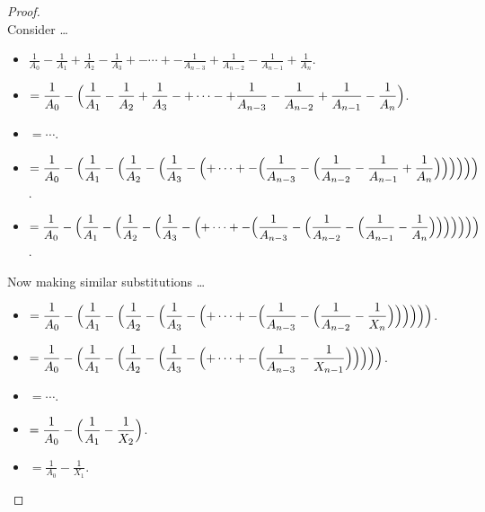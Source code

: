 \documentclass[12pt]{article}
\newcommand{\ds}{\displaystyle}
\theoremstyle{plain}
\begin{document}
\begin{proof}
  \ \\

  Consider \dots

  \begin{itemize}
    \item $ \ds \frac{1}{A_{0}} - \frac{1}{A_{1}} + \frac{1}{A_{2}} - \frac{1}{A_{3}} +- \cdots +- \frac{1}{A_{n-3}} + \frac{1}{A_{n-2}} - \frac{1}{A_{n-1}} + \frac{1}{A_{n}} $.
    \item $ \ds = \frac{1}{A_{0}} - \Bigl( \frac{1}{A_{1}} - \frac{1}{A_{2}} + \frac{1}{A_{3}} -+ \cdots -+ \frac{1}{A_{n-3}} - \frac{1}{A_{n-2}} + \frac{1}{A_{n-1}} - \frac{1}{A_{n}} \Bigr) $.
    \item $ \ds = \cdots $.
    \item $ \ds = \frac{1}{A_{0}} - \Bigl( \frac{1}{A_{1}} - \Bigl( \frac{1}{A_{2}} - \Bigl( \frac{1}{A_{3}} - \Bigl( + \cdots +- \Bigl( \frac{1}{A_{n-3}} - \Bigl( \frac{1}{A_{n-2}} - \frac{1}{A_{n-1}} + \frac{1}{A_{n}} \Bigr) \Bigr) \Bigr) \Bigr) \Bigr) \Bigr) $.
    \item $ \ds = \frac{1}{A_{0}} - \Bigl( \frac{1}{A_{1}} - \Bigl( \frac{1}{A_{2}} - \Bigl( \frac{1}{A_{3}} - \Bigl( + \cdots +- \Bigl( \frac{1}{A_{n-3}} - \Bigl( \frac{1}{A_{n-2}} - \Bigl(  \frac{1}{A_{n-1}} - \frac{1}{A_{n}} \Bigr) \Bigr) \Bigr) \Bigr) \Bigr) \Bigr) \Bigr) $.
  \end{itemize}

  Now making similar substitutions \dots

  \begin{itemize}
    \item $ \ds = \frac{1}{A_{0}} - \Bigl( \frac{1}{A_{1}} - \Bigl( \frac{1}{A_{2}} - \Bigl( \frac{1}{A_{3}} - \Bigl( + \cdots +- \Bigl( \frac{1}{A_{n-3}} - \Bigl( \frac{1}{A_{n-2}} - \frac{1}{X_{n}} \Bigr) \Bigr) \Bigr) \Bigr) \Bigr) \Bigr) $.
    \item $ \ds = \frac{1}{A_{0}} - \Bigl( \frac{1}{A_{1}} - \Bigl( \frac{1}{A_{2}} - \Bigl( \frac{1}{A_{3}} - \Bigl( + \cdots +- \Bigl( \frac{1}{A_{n-3}} -  \frac{1}{X_{n-1}} \Bigr) \Bigr) \Bigr) \Bigr) \Bigr) $.
    \item $ \ds = \cdots $.
    \item $ \ds = \frac{1}{A_{0}} - \Bigl( \frac{1}{A_{1}} - \frac{1}{X_{2}} \Bigr) $.
    \item $ \ds = \frac{1}{A_{0}} - \frac{1}{X_{1}} $.
  \end{itemize}

  \newpage


\end{proof}
\end{document}
